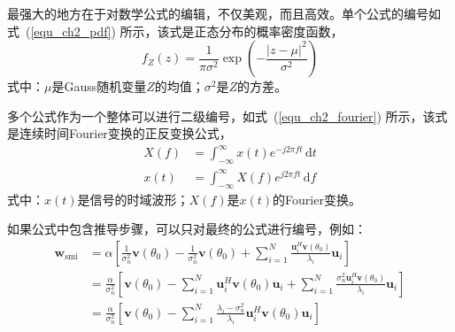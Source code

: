 
最强大的地方在于对数学公式的编辑，不仅美观，而且高效。单个公式的编号如式~(\ref{equ_ch2_pdf}) 所示，该式是正态分布的概率密度函数\cite{Manolakis2005}，
\begin{equation}\label{equ_ch2_pdf}
	f_Z(z)=\frac{1}{\pi\sigma^2}\exp\left(-\frac{|z-\mu|^2}{\sigma^2}\right)
\end{equation}
式中：$\mu$是Gauss随机变量$Z$的均值；$\sigma^2$是$Z$的方差。


多个公式作为一个整体可以进行二级编号，如式~(\ref{equ_ch2_fourier}) 所示，该式是连续时间Fourier变换的正反变换公式\cite{Vetterli2014}，
\begin{subequations}\label{equ_ch2_fourier}
	\begin{align}
		X(f)&=\int_{-\infty}^{\infty}x(t)e^{-j2\pi f t}\,\mathrm{d}t\\
		x(t)&=\int_{-\infty}^{\infty}X(f)e^{j2\pi f t}\,\mathrm{d}f
	\end{align}
\end{subequations}
式中：$x(t)$是信号的时域波形；$X(f)$是$x(t)$的Fourier变换。

如果公式中包含推导步骤，可以只对最终的公式进行编号，例如：
\begin{align}
	\bm{w}_{\mathrm{smi}}&=\alpha\left[\frac{1}{\sigma_n^2}\bm{v}(\theta_0)- \frac{1}{\sigma_n^2}\bm{v}(\theta_0)+\sum_{i=1}^{N}\frac{\bm{u}_i^H\bm{v}(\theta_0)}{\lambda_i} \bm{u}_i\right]\nonumber\\
	&=\frac{\alpha}{\sigma_n^2}\left[\bm{v}(\theta_0)- \sum_{i=1}^{N}\bm{u}_i^H\bm{v}(\theta_0)\bm{u}_i+ \sum_{i=1}^{N}\frac{\sigma_n^2\bm{u}_i^H\bm{v}(\theta_0)}{\lambda_i}\bm{u}_i\right]\nonumber\\
	&=\frac{\alpha}{\sigma_n^2}\left[\bm{v}(\theta_0)-\sum_{i=1}^{N} \frac{\lambda_i-\sigma_n^2}{\lambda_i}\bm{u}_i^H\bm{v}(\theta_0)\bm{u}_i\right]
\end{align}

